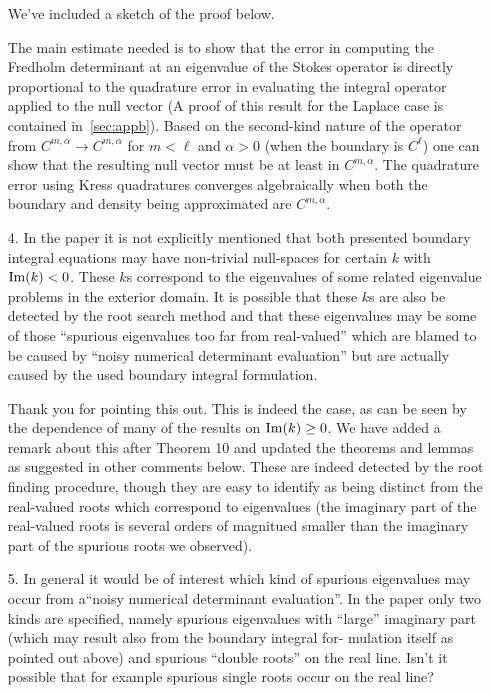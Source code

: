 \documentclass{article}
\begin{document}
\begin{itemize}
We've included a sketch of the proof below. 

The main estimate needed is to show that the error in computing
the Fredholm determinant at an eigenvalue of the Stokes operator
is directly proportional to the quadrature error in 
evaluating the integral operator applied to the null vector (A proof of this result for the 
Laplace case is contained in~\cref{sec:appb}). 
Based on the second-kind nature of the operator from $C^{m,\alpha} \to C^{m,\alpha}$
for $m<\ell$ and $\alpha>0$ (when the boundary is $C^{\ell}$) one can show
that the resulting null vector must be at least in $C^{m,\alpha}$.
The quadrature error using Kress quadratures converges algebraically
when both the boundary and density being approximated are $C^{m,\alpha}$. 

\item[4.] {\color{blue} In the paper it is not explicitly mentioned that
  both presented boundary integral equations may have non-trivial null-spaces
  for certain $k$ with ${\rm Im}(k) < 0$. These $k$s correspond to the eigenvalues of some
  related eigenvalue problems in the exterior domain. It is possible that
  these $k$s are also be detected by the root search method and that these
  eigenvalues may be some of those “spurious eigenvalues too far from
  real-valued” which are blamed to be caused by “noisy numerical determinant
  evaluation” but are actually caused by the used boundary integral formulation.}

Thank you for pointing this out. This is indeed the case, as can be seen
by the dependence of many of the results on ${\rm Im}(k) \geq 0$. We have
added a remark about this after Theorem 10 and updated the theorems and lemmas
as suggested in other comments below. These are indeed detected by the
root finding procedure, though they are easy to identify as
being distinct from the real-valued roots which correspond to
eigenvalues (the imaginary part of the real-valued roots is several
orders of magnitued smaller than the imaginary part of the
spurious roots we observed).

\item[5.] {\color{blue}
  In general it would be of interest which kind of spurious eigenvalues may
occur from a“noisy numerical determinant evaluation”. In the paper
only two kinds are specified, namely spurious eigenvalues with “large”
imaginary part (which may result also from the boundary integral for-
mulation itself as pointed out above) and spurious “double roots” on
the real line. Isn’t it possible that for example spurious single roots
occur on the real line?}


\end{itemize}
\end{document}
